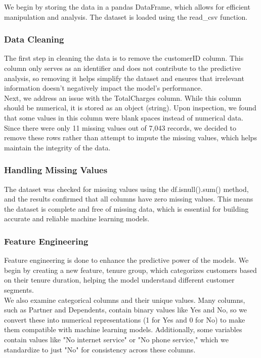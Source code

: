We begin by storing the data in a pandas DataFrame, which allows for efficient manipulation and analysis. The dataset is loaded using the read\_csv function.

\subsubsection{Data Cleaning}
The first step in cleaning the data is to remove the customerID column. This column only serves as an identifier and does not contribute to the predictive analysis, so removing it helps simplify the dataset and ensures that irrelevant information doesn't negatively impact the model's performance.\\

Next, we address an issue with the TotalCharges column. While this column should be numerical, it is stored as an object (string). Upon inspection, we found that some values in this column were blank spaces instead of numerical data. Since there were only 11 missing values out of 7,043 records, we decided to remove these rows rather than attempt to impute the missing values, which helps maintain the integrity of the data.

\subsubsection{Handling Missing Values}
The dataset was checked for missing values using the df.isnull().sum() method, and the results confirmed that all columns have zero missing values. This means the dataset is complete and free of missing data, which is essential for building accurate and reliable machine learning models.

\subsubsection{Feature Engineering}
Feature engineering is done to enhance the predictive power of the models. We begin by creating a new feature, tenure group, which categorizes customers based on their tenure duration, helping the model understand different customer segments.\\

We also examine categorical columns and their unique values. Many columns, such as Partner and Dependents, contain binary values like Yes and No, so we convert these into numerical representations (1 for Yes and 0 for No) to make them compatible with machine learning models. Additionally, some variables contain values like "No internet service" or "No phone service," which we standardize to just "No" for consistency across these columns.\\

